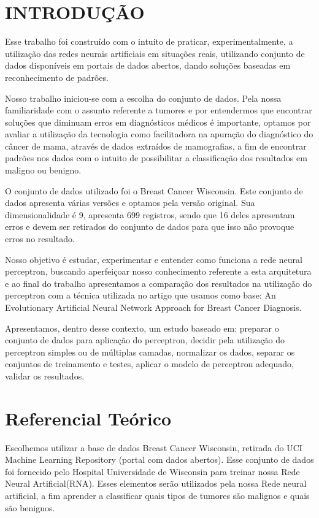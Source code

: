 \documentclass[conference]{IEEEtran}
\begin{document}
\section{INTRODUÇÃO}

    Esse trabalho foi construído com o intuito de praticar, experimentalmente, a utilização das redes neurais artificiais em situações reais, utilizando conjunto de dados disponíveis em portais de dados abertos, dando soluções baseadas em reconhecimento de padrões.

    Nosso trabalho iniciou-se com a escolha do conjunto de dados. Pela nossa familiaridade com o assunto referente a tumores e por entendermos que encontrar soluções que diminuam erros em diagnósticos médicos é importante, optamos por avaliar a utilização da tecnologia como facilitadora na apuração do diagnóstico do câncer de mama, através de dados extraídos de mamografias, a fim de encontrar padrões nos dados com o intuito de possibilitar a classificação dos resultados em maligno ou benigno.
    
    O conjunto de dados utilizado foi o Breast Cancer Wisconsin. Este conjunto de dados apresenta várias versões e optamos pela versão original. Sua dimensionalidade é 9, apresenta 699 registros, sendo que 16 deles apresentam erros e devem ser retirados do conjunto de dados para que isso não provoque erros no resultado.
    
    Nosso objetivo é estudar, experimentar e entender como funciona a rede neural perceptron, buscando aperfeiçoar nosso conhecimento referente a esta arquitetura e ao final do trabalho apresentamos a comparação dos resultados na utilização do perceptron com a técnica utilizada no artigo que usamos como base: An Evolutionary Artificial Neural Network Approach for Breast Cancer Diagnosis.
    
    Apresentamos, dentro desse contexto, um estudo baseado em: preparar o conjunto de dados para aplicação do perceptron, decidir pela utilização do perceptron simples ou de múltiplas camadas, normalizar os dados, separar os conjuntos de treinamento e testes, aplicar o modelo de perceptron adequado, validar os resultados.


\section{Referencial Teórico}
	
	Escolhemos utilizar a base de dados Breast Cancer Wisconsin, retirada do UCI Machine Learning Repository (portal com dados abertos). Esse conjunto de dados foi fornecido pelo Hospital Universidade de Wisconsin para treinar nossa Rede Neural Artificial(RNA). Esses elementos serão utilizados pela nossa Rede neural artificial, a fim aprender a classificar quais tipos de tumores são malignos e quais são benignos. 
	
\end{document}
